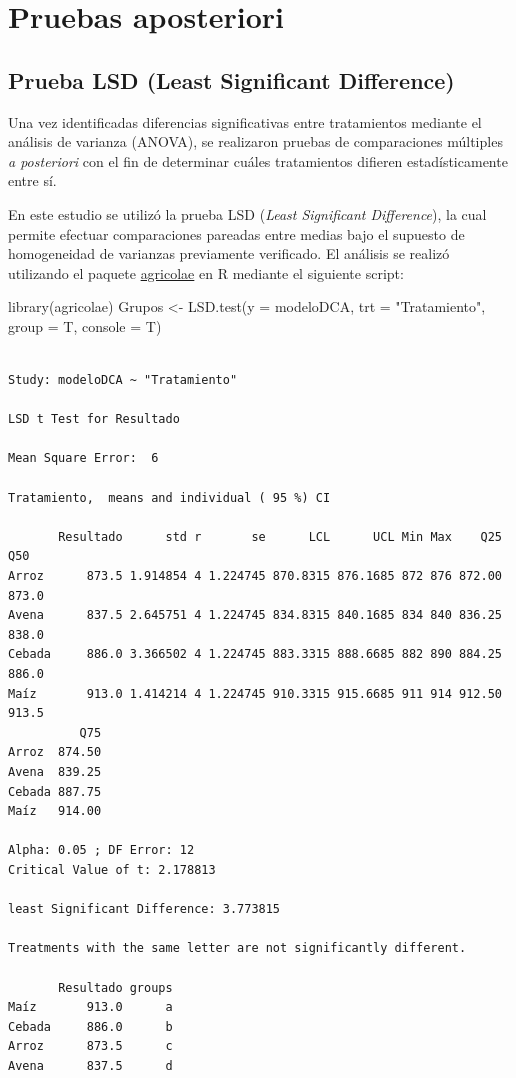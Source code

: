 \documentclass[
  spanish,
  letterpaper,
  DIV=11,
  numbers=noendperiod]{scrreprt}
\newenvironment{Shaded}{\begin{snugshade}}{\end{snugshade}}
\newcommand{\AttributeTok}[1]{\textcolor[rgb]{0.40,0.45,0.13}{#1}}
\newcommand{\FunctionTok}[1]{\textcolor[rgb]{0.28,0.35,0.67}{#1}}
\newcommand{\NormalTok}[1]{\textcolor[rgb]{0.00,0.23,0.31}{#1}}
\newcommand{\OtherTok}[1]{\textcolor[rgb]{0.00,0.23,0.31}{#1}}
\newcommand{\StringTok}[1]{\textcolor[rgb]{0.13,0.47,0.30}{#1}}
\begin{document}
\section{Pruebas aposteriori}\label{pruebas-aposteriori}

\subsection{Prueba LSD (Least Significant
Difference)}\label{prueba-lsd-least-significant-difference}

Una vez identificadas diferencias significativas entre tratamientos
mediante el análisis de varianza (ANOVA), se realizaron pruebas de
comparaciones múltiples \emph{a posteriori} con el fin de determinar
cuáles tratamientos difieren estadísticamente entre sí.

En este estudio se utilizó la prueba LSD (\emph{Least Significant
Difference}), la cual permite efectuar comparaciones pareadas entre
medias bajo el supuesto de homogeneidad de varianzas previamente
verificado. El análisis se realizó utilizando el paquete \ul{agricolae}
en R mediante el siguiente script:

\begin{Shaded}
\begin{Highlighting}[]
\FunctionTok{library}\NormalTok{(agricolae)}
\NormalTok{Grupos }\OtherTok{\textless{}{-}} \FunctionTok{LSD.test}\NormalTok{(}\AttributeTok{y =}\NormalTok{ modeloDCA, }\AttributeTok{trt =} \StringTok{"Tratamiento"}\NormalTok{, }\AttributeTok{group =}\NormalTok{ T, }\AttributeTok{console =}\NormalTok{ T)}
\end{Highlighting}
\end{Shaded}

\begin{verbatim}

Study: modeloDCA ~ "Tratamiento"

LSD t Test for Resultado 

Mean Square Error:  6 

Tratamiento,  means and individual ( 95 %) CI

       Resultado      std r       se      LCL      UCL Min Max    Q25   Q50
Arroz      873.5 1.914854 4 1.224745 870.8315 876.1685 872 876 872.00 873.0
Avena      837.5 2.645751 4 1.224745 834.8315 840.1685 834 840 836.25 838.0
Cebada     886.0 3.366502 4 1.224745 883.3315 888.6685 882 890 884.25 886.0
Maíz       913.0 1.414214 4 1.224745 910.3315 915.6685 911 914 912.50 913.5
          Q75
Arroz  874.50
Avena  839.25
Cebada 887.75
Maíz   914.00

Alpha: 0.05 ; DF Error: 12
Critical Value of t: 2.178813 

least Significant Difference: 3.773815 

Treatments with the same letter are not significantly different.

       Resultado groups
Maíz       913.0      a
Cebada     886.0      b
Arroz      873.5      c
Avena      837.5      d
\end{verbatim}
\end{document}

